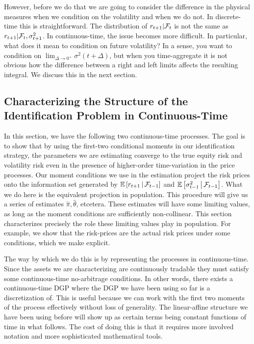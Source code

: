 \documentclass[11pt, letterpaper, twoside, final]{article}
\begin{document}
However, before we do that we are going to consider the difference in the physical measures when we condition on
the volatility and when we do not.
In discrete-time this is straightforward.
The distribution of $ r_{t+1} \vert \mathcal{F}_t$ is not the same as $r_{t+1} \vert \mathcal{F}_t, \sigma^2_{t+1}$.
In continuous-time, the issue becomes more difficult.
In particular, what does it mean to condition on future volatility? 
In a sense, you want to condition on $\lim_{\Delta \to 0^{+}} \sigma^2(t+\Delta)$, but when you time-aggregate
it is not obvious how the difference between a right and left limits affects the resulting integral.
We discuss this in the next section.

\subsection{Characterizing the Structure of the Identification Problem in Continuous-Time}

In this section, we have the following two continuous-time processes.
The goal is to show that by using the first-two conditional moments in our identification strategy, the parameters
we are estimating converge to the true equity risk and volatility risk even in the presence of higher-order
time-variation in the price processes.
Our moment conditions we use in the estimation project the risk prices onto the information set generated by
$\operatorname{\mathbb{E}}\left[r_{t+1}\,\middle\vert\, \mathcal{F}_{t-1}\right]$  and $\operatorname{\mathbb{E}}\left[\sigma^2_{t-1} \,\middle\vert\, \mathcal{F}_{t-1}\right]$.
What we do here is the equivalent projection in population.
This procedure will give us a series of estimates $\hat{\pi}, \hat{\theta}$, etcetera.
These estimates will have some limiting values, as long as the moment conditions are sufficiently non-collinear.
This section characterizes precisely the role these limiting values play in population.
For example, we show that the risk-prices are the actual risk prices under some conditions, which we make
explicit.

The way by which we do this is by representing the processes in continuous-time.
Since the assets we are characterizing are continuously tradable they must satisfy some continuous-time
no-arbitrage conditions. 
In other words, there exists a continuous-time DGP where the DGP we have been using so far is a discretization of. 
This is useful because we can work with the first two moments of the process effectively without loss of
generality.
The linear-affine structure we have been using before will show up as certain terms being constant functions of
time in what follows.
The cost of doing this is that it requires more involved notation and more sophisticated mathematical tools.
\end{document}

